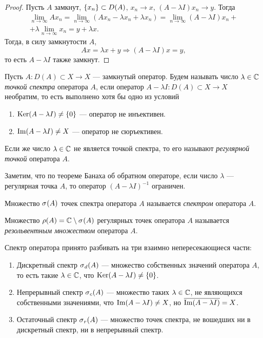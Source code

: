 \begin{proof}
    Пусть $A$ замкнут, $\menge{x_n} \subset D(A)$, $x_n \to x$, $(A- \lambda I)x_n \to y$.
    Тогда
    \begin{multline*}
        \lim_{n\to \infty} Ax_n = \lim_{n\to \infty} (Ax_n - \lambda x_n + \lambda x_n) = 
            \lim_{n\to \infty} (A - \lambda I)x_n + \\ + \lambda \lim_{n\to \infty} x_n 
            = y + \lambda x.
    \end{multline*}
    Тогда, в силу замкнутости $A$,
    \[ Ax = \lambda x + y \Rightarrow (A - \lambda I)x = y, \]
    то есть $A - \lambda I$ также замкнут.
\end{proof}

\begin{definition}
    Пусть $A \colon D(A) \subset X \to X$ --- замкнутый оператор. 
    Будем называть число $\lambda \in \fieldc$ \emph{точкой спектра} оператора $A$, если оператор 
    $ A - \lambda I \colon D(A) \subset X \to X $ необратим, то есть выполнено хотя бы одно из 
    условий
    \begin{enumerate}
        \item $\ker (A - \lambda I) \neq \menge{0}$ --- оператор не инъективен.
        \item $\im (A - \lambda I) \neq X$ --- оператор не сюръективен.
    \end{enumerate}

    Если же число $\lambda \in \fieldc$ не является точкой спектра, то его называют
    \emph{регулярной точкой} оператора $A$.
\end{definition}

Заметим, что по теореме Банаха об обратном операторе, если число $\lambda$ --- регулярная точка
$A$, то оператор $(A - \lambda I)^{-1}$ ограничен.

\begin{definition}
    Множество $\spectrum{A}$ точек спектра оператора $A$ называется \emph{спектром} оператора $A$.
\end{definition}   

\begin{definition}
    Множество $\resset{A} = \fieldc \setminus \spectrum{A}$ регулярных точек оператора $A$
    называется \emph{резольвентным множеством} оператора $A$.
\end{definition}

Спектр оператора принято разбивать на три взаимно непересекающиеся части:
\begin{enumerate}
    \item Дискретный спектр $\spectrum[d]{A}$ --- множество собственных значений оператора $A$, то есть такие $\lambda \in \fieldc$, что $\ker (A - \lambda I) \neq \menge{0}$.
    \item Непрерывный спектр $\spectrum[c]{A}$ --- множество таких $\lambda \in \fieldc$, не
    являющихся собственными значениями, что $\im (A - \lambda I) \neq X$, но 
    $\overline{\im (A - \lambda I)} = X$.
    \item Остаточный спектр $\spectrum[r]{A}$ --- множество точек спектра, не вошедших ни в
    дискретный спектр, ни в непрерывный спектр.
\end{enumerate}

